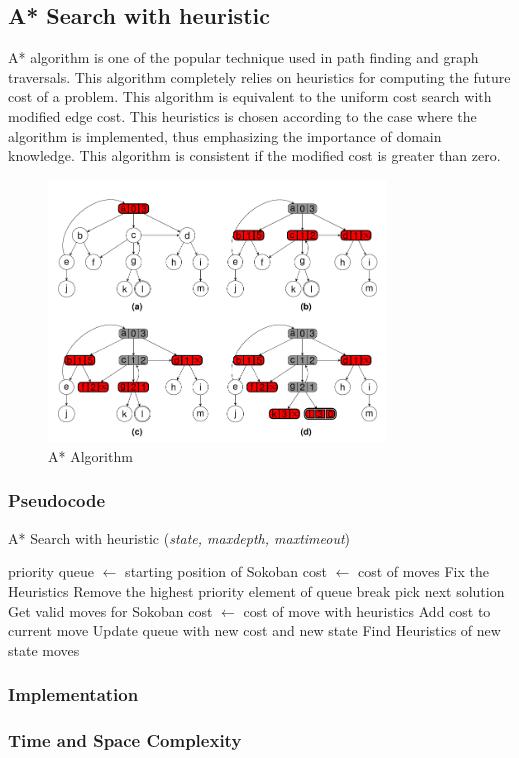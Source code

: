 \subsection{A* Search with heuristic}
\noindent A* algorithm is one of the popular technique used in path finding and graph traversals. This algorithm completely relies on heuristics for computing the future cost of a problem. This algorithm is equivalent to the uniform cost search with modified edge cost. This heuristics is chosen according to the case where the algorithm is implemented, thus emphasizing the importance of domain knowledge. This algorithm is consistent if the modified cost is greater than zero.

\begin{figure}[H]
	\centering
	\includegraphics[width=0.8\textwidth]{./imgs/astar.png}
	\caption{A* Algorithm}
\end{figure}

\subsubsection{Pseudocode}
\begin{algorithm}[H]
	\caption{A* Search with heuristic (\textit{state, maxdepth, maxtimeout})}
	\label{alg:ucs}
	\begin{algorithmic}[1]
	\State priority queue $\gets$ starting position of Sokoban
	\State cost $\gets$ cost of moves
	\State Fix the Heuristics 
		\State Remove the highest priority element of queue
			\State break
		\Else
				\State pick next solution
			\Else
				\State Get valid moves for Sokoban
					\State cost $\gets$ cost of move with heuristics
					\State Add cost to current move
					\State Update queue with new cost and new state
					\State Find Heuristics of new state
				\EndFor
			\EndIf
		\EndIf
	\EndWhile
	\State \Return moves
	\end{algorithmic}
\end{algorithm}

\subsubsection{Implementation}

\subsubsection{Time and Space Complexity}